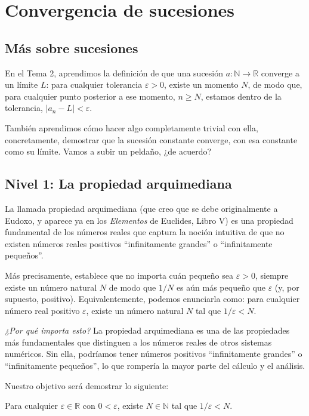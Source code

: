 \chapter{Convergencia de sucesiones}

\section{Más sobre sucesiones}

En el Tema 2, aprendimos la definición de que una sucesión $a : \mathbb{N} \to \mathbb{R}$ converge a un límite $L$: para cualquier tolerancia $\varepsilon > 0$, existe un momento $N$, de modo que, para cualquier punto posterior a ese momento, $n \ge N$, estamos dentro de la tolerancia, $|a_n - L| < \varepsilon$.

También aprendimos cómo hacer algo completamente trivial con ella, concretamente, demostrar que la sucesión constante converge, con esa constante como su límite. Vamos a subir un peldaño, ¿de acuerdo?


\section{Nivel 1: La propiedad arquimediana}

La llamada propiedad arquimediana (que creo que se debe originalmente a Eudoxo, y aparece ya en los \textit{Elementos} de Euclides, Libro V) es una propiedad fundamental de los números reales que captura la noción intuitiva de que no existen números reales positivos ``infinitamente grandes'' o ``infinitamente pequeños''.

Más precisamente, establece que no importa cuán pequeño sea $\varepsilon > 0$, siempre existe un número natural $N$ de modo que $1/N$ es aún más pequeño que $\varepsilon$ (y, por supuesto, positivo). Equivalentemente, podemos enunciarla como: para cualquier número real positivo $\varepsilon$, existe un número natural $N$ tal que $1/\varepsilon < N$.

\textit{¿Por qué importa esto?} La propiedad arquimediana es una de las propiedades más fundamentales que distinguen a los números reales de otros sistemas numéricos. Sin ella, podríamos tener números positivos ``infinitamente grandes'' o ``infinitamente pequeños'', lo que rompería la mayor parte del cálculo y el análisis.

Nuestro objetivo será demostrar lo siguiente:
\begin{theorem}[PropArq]
  Para cualquier $\varepsilon \in \mathbb{R}$ con $0 < \varepsilon$, existe $N \in \mathbb{N}$ tal que $1/\varepsilon < N$.
\end{theorem}

